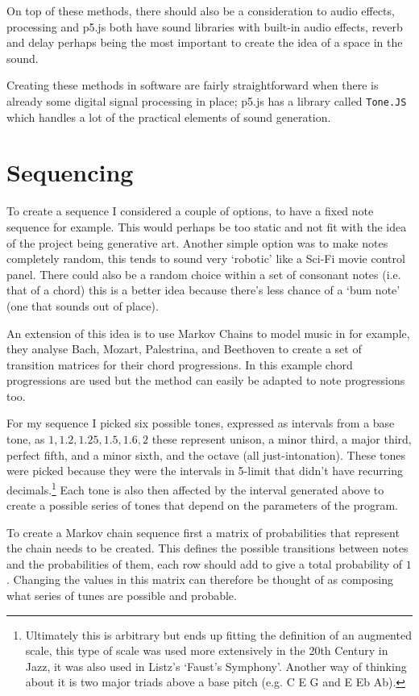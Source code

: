 On top of these methods, there should also be a consideration to audio effects,
processing and p5.js both have sound libraries with built-in audio effects,
reverb and delay perhaps being the most important to create the idea of a space
in the sound.

Creating these methods in software are fairly straightforward when there is
already some digital signal processing in place; p5.js has a library called
\verb|Tone.JS| which handles a lot of the practical elements of sound
generation.

\section{Sequencing}
To create a sequence I considered a couple of options, to have a fixed note
sequence for example. This would perhaps be too static and not fit with the idea
of the project being generative art. Another simple option was to make notes
completely random, this tends to sound very `robotic' like a Sci-Fi movie
control panel. There could also be a random choice within a set of consonant
notes (i.e. that of a chord) this is a better idea because there's less chance
of a `bum note' (one that sounds out of place).

An extension of this idea is to use Markov Chains to model music in
\citep{ballstate2016} for example, they analyse Bach, Mozart, Palestrina, and
Beethoven to create a set of transition matrices for their chord progressions.
In this example chord progressions are used but the method can easily be adapted
to note progressions too. 

For my sequence I picked six possible tones, expressed as intervals from a base
tone, as $1, 1.2, 1.25, 1.5, 1.6, 2$ these represent unison, a minor third, a
major third, perfect fifth, and a minor sixth, and the octave (all
just-intonation). These tones were picked because they were the intervals in
5-limit that didn't have recurring decimals.\footnote{Ultimately this is arbitrary but
ends up fitting the definition of an augmented scale, this type of scale was
used more extensively in the 20th Century in Jazz, it was also used in Listz's
`Faust's Symphony'. Another way of thinking about it is two major triads above a
base pitch (e.g. C E G and E Eb Ab).} Each tone is also then affected by the
interval generated above to create a possible series of tones that depend on the
parameters of the program.

To create a Markov chain sequence first a matrix of probabilities that represent
the chain needs to be created. This defines the possible transitions between
notes and the probabilities of them, each row should add to give a total
probability of $1$. Changing the values in this matrix can therefore be thought
of as composing what series of tunes are possible and probable.

